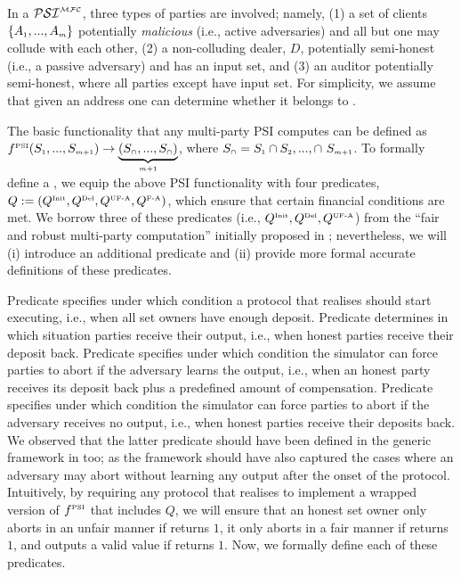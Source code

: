   
In a  $\mathcal{PSI}^{\scriptscriptstyle \mathcal{MFC}}$, three types of parties are involved; namely, (1) a set of clients $\{A_{\scriptscriptstyle 1},...,A_{\scriptscriptstyle m}\}$ potentially \emph{malicious} (i.e., active adversaries) and all but one may collude with each other, (2) a non-colluding dealer, $D$, potentially semi-honest (i.e., a passive adversary) and has an input set, and (3) an auditor \aud potentially semi-honest, where all parties except \aud have input set. For simplicity, we assume that given an address one can determine whether it belongs to \aud. 


The basic functionality that any multi-party PSI computes can be defined as $f^{\scriptscriptstyle\text{PSI}} (S_{\scriptscriptstyle 1},..., S_{\scriptscriptstyle m+1})\rightarrow\underbrace{(S_{\scriptscriptstyle\cap},..., S_{\scriptscriptstyle\cap})}_{\scriptscriptstyle m+1}$, where $S_{\scriptscriptstyle\cap}= S_{\scriptscriptstyle 1} \cap S_{\scriptscriptstyle 2}, ...,\cap\  S_{\scriptscriptstyle m+1}$.  To formally define a \p, we equip the above PSI functionality with four predicates,  $Q:=(Q^{\scriptscriptstyle \text{Init}}, Q^{\scriptscriptstyle \text{Del}}, Q^{\scriptscriptstyle \text{UF-A}}, Q^{\scriptscriptstyle \text{F-A}})$, which ensure that certain financial conditions are met. 
   We borrow three of these predicates (i.e., $Q^{\scriptscriptstyle \text{Init}}, Q^{\scriptscriptstyle \text{Del}}, Q^{\scriptscriptstyle \text{UF-A}}$) from the ``fair and robust multi-party computation'' initially proposed in \cite{KiayiasZZ16}; nevertheless, we will (i) introduce an additional predicate  \qFAbt and (ii) provide more formal accurate definitions of these predicates. 
   
Predicate \qinit specifies under which condition a protocol that realises \p should start executing, i.e., when all set owners have enough deposit. Predicate \qdel determines in which situation parties receive their output, i.e., when honest parties receive their deposit back. Predicate \qUnFAbt specifies under which condition the simulator can force parties to abort if the adversary learns the output,  i.e., when an honest party receives its deposit back plus a predefined amount of compensation. Predicate \qFAbt specifies under which condition the simulator can force parties to abort if the adversary receives no output, i.e., when honest parties receive their deposits back. We observed that the latter predicate should have been defined in the generic framework in \cite{KiayiasZZ16} too; as the framework should have also captured the cases where an adversary may abort without learning any output after the onset of the protocol.  Intuitively, by requiring any protocol that realises \p to implement a wrapped version of $f^{\scriptscriptstyle\text{PSI}}$ that includes $Q$, we will ensure that an honest set owner only aborts in an unfair manner if \qUnFAbt returns  $1$, it only aborts in a fair manner if \qFAbt returns  $1$, and outputs a valid value if \qdel returns $1$. Now, we formally define each of these predicates.  
 

